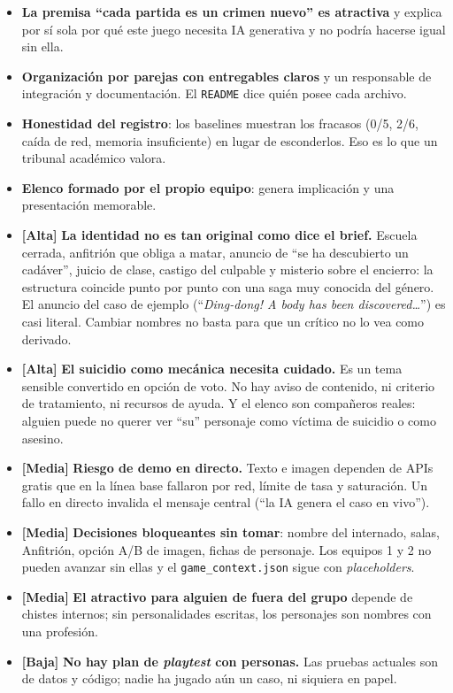 \documentclass[11pt,a4paper]{article}
\newcommand{\file}[1]{\texttt{\small #1}}
\newcommand{\prio}[1]{\textbf{\color{neon}[#1]}}
\begin{document}
\begin{fuerte}
\begin{itemize}
\item \textbf{La premisa ``cada partida es un crimen nuevo'' es atractiva} y explica por sí sola por
qué este juego necesita IA generativa y no podría hacerse igual sin ella.
\item \textbf{Organización por parejas con entregables claros} y un responsable de integración y
documentación. El \file{README} dice quién posee cada archivo.
\item \textbf{Honestidad del registro}: los baselines muestran los fracasos (0/5, 2/6, caída de red,
memoria insuficiente) en lugar de esconderlos. Eso es lo que un tribunal académico valora.
\item \textbf{Elenco formado por el propio equipo}: genera implicación y una presentación memorable.
\end{itemize}
\end{fuerte}

\begin{debil}
\begin{itemize}
\item \prio{Alta} \textbf{La identidad no es tan original como dice el brief.} Escuela cerrada,
anfitrión que obliga a matar, anuncio de ``se ha descubierto un cadáver'', juicio de clase,
castigo del culpable y misterio sobre el encierro: la estructura coincide punto por punto con una
saga muy conocida del género. El anuncio del caso de ejemplo (``\emph{Ding-dong! A body has been
discovered\ldots}'') es casi literal. Cambiar nombres no basta para que un crítico no lo vea como
derivado.
\item \prio{Alta} \textbf{El suicidio como mecánica necesita cuidado.} Es un tema sensible convertido
en opción de voto. No hay aviso de contenido, ni criterio de tratamiento, ni recursos de ayuda. Y
el elenco son compañeros reales: alguien puede no querer ver ``su'' personaje como víctima de
suicidio o como asesino.
\item \prio{Media} \textbf{Riesgo de demo en directo.} Texto e imagen dependen de APIs gratis que en
la línea base fallaron por red, límite de tasa y saturación. Un fallo en directo invalida el mensaje
central (``la IA genera el caso en vivo'').
\item \prio{Media} \textbf{Decisiones bloqueantes sin tomar}: nombre del internado, salas, Anfitrión,
opción A/B de imagen, fichas de personaje. Los equipos 1 y 2 no pueden avanzar sin ellas y el
\file{game\_context.json} sigue con \emph{placeholders}.
\item \prio{Media} \textbf{El atractivo para alguien de fuera del grupo} depende de chistes internos;
sin personalidades escritas, los personajes son nombres con una profesión.
\item \prio{Baja} \textbf{No hay plan de \emph{playtest} con personas.} Las pruebas actuales son de
datos y código; nadie ha jugado aún un caso, ni siquiera en papel.
\end{itemize}
\end{debil}
\end{document}
